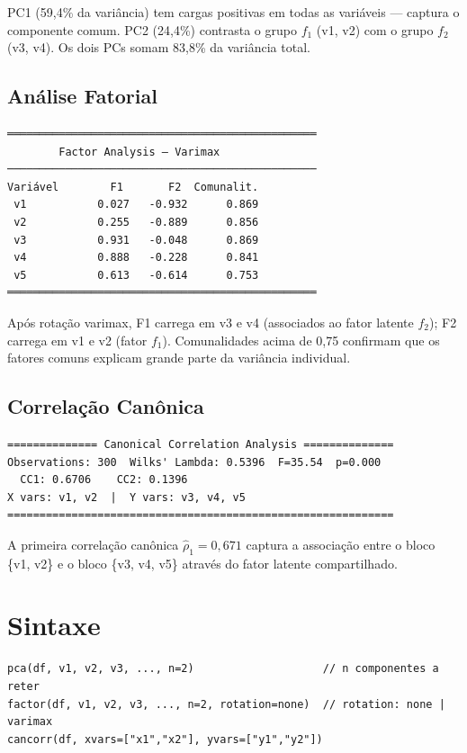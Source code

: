 PC1 (59{,}4\% da variância) tem cargas positivas em todas as variáveis —
captura o componente comum. PC2 (24{,}4\%) contrasta o grupo $f_1$ (v1, v2)
com o grupo $f_2$ (v3, v4). Os dois PCs somam 83{,}8\% da variância total.

\subsection*{Análise Fatorial}

\begin{lstlisting}[language={}, basicstyle=\ttfamily\small,
  frame=none, numbers=none, backgroundcolor=\color{codbg},
  xleftmargin=0pt, xrightmargin=0pt, breaklines=false]
════════════════════════════════════════════════
        Factor Analysis — Varimax
────────────────────────────────────────────────
Variável        F1       F2  Comunalit.
 v1           0.027   -0.932      0.869
 v2           0.255   -0.889      0.856
 v3           0.931   -0.048      0.869
 v4           0.888   -0.228      0.841
 v5           0.613   -0.614      0.753
════════════════════════════════════════════════
\end{lstlisting}

Após rotação varimax, F1 carrega em v3 e v4 (associados ao fator latente
$f_2$); F2 carrega em v1 e v2 (fator $f_1$). Comunalidades acima de 0{,}75
confirmam que os fatores comuns explicam grande parte da variância individual.

\subsection*{Correlação Canônica}

\begin{lstlisting}[language={}, basicstyle=\ttfamily\small,
  frame=none, numbers=none, backgroundcolor=\color{codbg},
  xleftmargin=0pt, xrightmargin=0pt, breaklines=false]
============== Canonical Correlation Analysis ==============
Observations: 300  Wilks' Lambda: 0.5396  F=35.54  p=0.000
  CC1: 0.6706    CC2: 0.1396
X vars: v1, v2  |  Y vars: v3, v4, v5
============================================================
\end{lstlisting}

A primeira correlação canônica $\hat\rho_1 = 0{,}671$ captura a associação
entre o bloco \{v1, v2\} e o bloco \{v3, v4, v5\} através do fator latente
compartilhado.

\section{Sintaxe}

\begin{lstlisting}
pca(df, v1, v2, v3, ..., n=2)                    // n componentes a reter
factor(df, v1, v2, v3, ..., n=2, rotation=none)  // rotation: none | varimax
cancorr(df, xvars=["x1","x2"], yvars=["y1","y2"])
\end{lstlisting}
